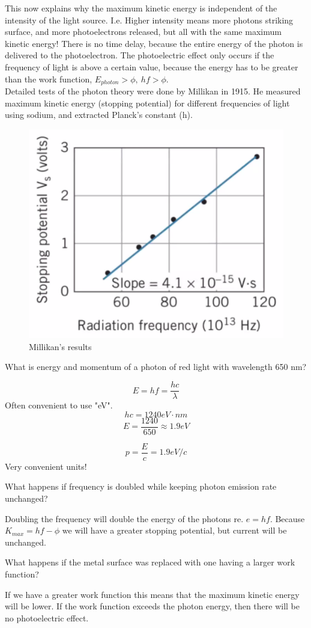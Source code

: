 \documentclass[class=article,crop=false]{standalone}
\begin{document}
This now explains why the maximum kinetic energy is independent of the intensity of the light source. I.e. Higher intensity means more photons striking surface, and more photoelectrons released, but all with the same maximum kinetic energy! There is no time delay, because the entire energy of the photon is delivered to the photoelectron. The photoelectric effect only occurs if the frequency of light is above a certain value, because the energy has to be greater than the work function, $E_{photon} > \phi,\ hf > \phi$. \\

Detailed tests of the photon theory were done by Millikan in 1915. He measured maximum kinetic energy (stopping potential) for different frequencies of light using sodium, and extracted Planck's constant (h).

\begin{figure}[h!]
	\centering
	\includegraphics[width=.4\linewidth]{./Images/millikan.png}
	\caption{Millikan's results}
\end{figure}

\newpage
\begin{question}
	What is energy and momentum of a photon of red light with wavelength 650 nm?
	\begin{answer}[Energy?]
		$$ E = hf = \frac{hc}{\lambda} $$
		Often convenient to use "eV".
		$$ hc = 1240 eV \cdot nm $$
		$$ E = \frac{1240}{650} \approx 1.9 eV $$
	\end{answer}
	\begin{answer}[Momentum?]
		$$ p = \frac{E}{c} = 1.9 eV/c $$
		Very convenient units!
	\end{answer}
\end{question}

\newpage
\begin{question}[Example]
	What happens if frequency is doubled while keeping photon emission rate unchanged?
	\begin{answer}[Frequency]
		Doubling the frequency will double the energy of the photons re. $e = hf$. Because $K_{max} = hf - \phi$ we will have a greater stopping potential, but current will be unchanged.
	\end{answer}
	What happens if the metal surface was replaced with one having a larger work function? 
	\begin{answer}
		If we have a greater work function this means that the maximum kinetic energy will be lower. If the work function exceeds the photon energy, then there will be no photoelectric effect.
	\end{answer}
\end{question}
\end{document}
